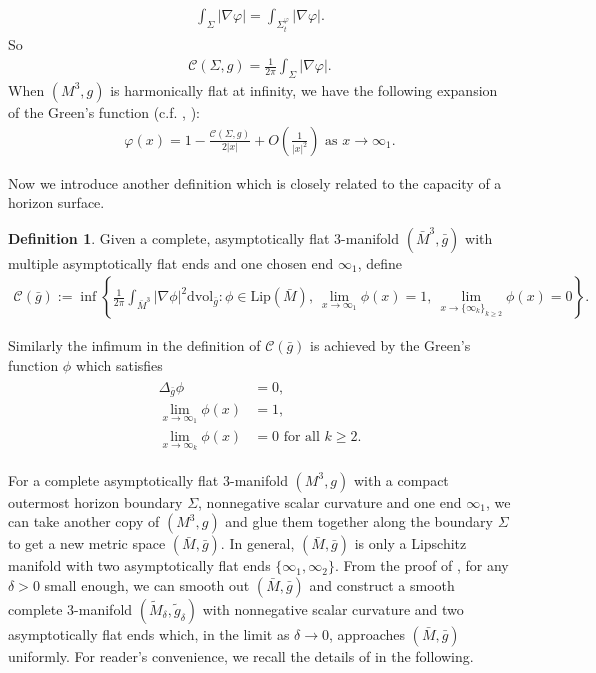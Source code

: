 \documentclass[letter]{amsart}
\theoremstyle{definition}
\newtheorem{defn}{Definition}[section]
\theoremstyle{remark}
\begin{document}
\begin{align}\label{h(ooo)}
	\int_{\Sigma} |\nabla \varphi | = \int_{\Sigma^{\varphi }_t} |\nabla \varphi |.
\end{align}
So
\begin{align}\label{cap-phi}
	\mathcal{C}(\Sigma, g) = \frac{1}{2 \pi } \int_{\Sigma}|\nabla \varphi |.
\end{align}
When $(M^3, g)$ is harmonically flat at infinity, we have the following expansion of the Green's function (c.f. \cite{Bartnik'86}, \cite[Equation (80)]{Bray'01}):
\begin{align}\label{phi-expan}
	\varphi (x) = 1 - \frac{\mathcal{C}(\Sigma,g)}{2|x|} + O\left(\frac{1}{|x|^2}\right) \text{ as } x\to \infty_1.
\end{align}

Now we introduce another definition which is closely related to the capacity of a horizon surface. 
\begin{defn}
	Given a complete, asymptotically flat $3$-manifold $(\bar{M}^3, \bar{g})$ with multiple asymptotically flat ends and one chosen end $\infty_1$, define
	\begin{align*}
		\mathcal{C}(\bar{g}) := \inf \left\{ \frac{1}{2 \pi }\int_{\bar{M}^3}|\nabla \phi |^2 \mathrm{dvol}_{\bar{g}}:  \phi \in \mathrm{Lip}(\bar{M}),\ \lim_{x\to \infty_1} \phi (x) =1,\ \lim_{x\to \{\infty_k\} _{k \geq 2}}\phi (x) =0 \right\} .
	\end{align*}
\end{defn}
Similarly the infimum in the definition of $\mathcal{C}(\bar{g})$ is achieved by the Green’s function $\phi $ which satisfies
\begin{align}\label{Green-2end}
	\begin{split}
		\Delta_{\bar{g}} \phi & =0,\\
		\lim_{x\to \infty_1} \phi (x) &= 1,\\
		\lim_{x\to \infty_k} \phi (x) &=0 \text{ for all } k \geq 2.
	\end{split}
\end{align}

For a complete asymptotically flat $3$-manifold $(M^3, g)$ with a compact outermost horizon boundary $\Sigma$, nonnegative scalar curvature and one end $\infty_1$, we can take another copy of $(M^3, g)$ and glue them together along the boundary $\Sigma$ to get a new metric space $(\bar{M}, \bar{g})$. In general, $(\bar{M}, \bar{g})$ is only a Lipschitz manifold with two asymptotically flat ends $\{\infty_1, \infty_2\} $. From the proof of \cite[Theorem 9]{Bray'01}, for any $\delta >0$ small enough, we can smooth out $(\bar{M}, \bar{g})$ and construct a smooth complete $3$-manifold $(\tilde{M}_{\delta }, \tilde{g}_\delta )$ with nonnegative scalar curvature and two asymptotically flat ends which, in the limit as $\delta \to 0$, approaches $(\bar{M}, \bar{g})$ uniformly. For reader's convenience, we recall the details of \cite{Bray'01} in the following.
\end{document}
